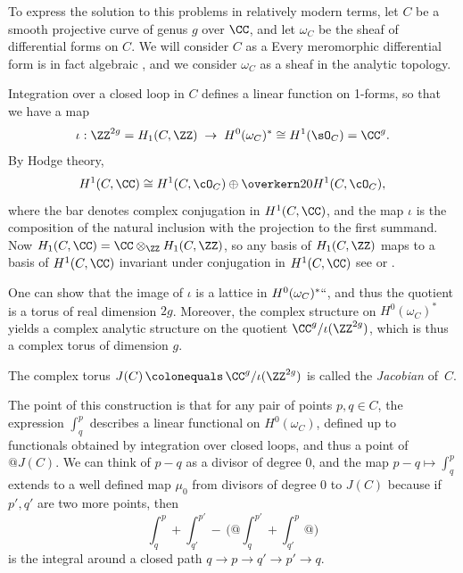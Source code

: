 To express the solution to this problems in relatively modern terms,
let $C$ be a smooth projective curve of genus $g$ over $\CC$, and let
$\omega_{C}$ be the sheaf of differential forms on $C$. We will
consider $C$ as a 
%
%
Every meromorphic differential form is in fact algebraic
\cite{SerreGAGA}, and we consider $\omega_{C}$ as a sheaf in the analytic topology.

Integration 
%
over a closed loop in $C$ defines a linear function on 1-forms, so that we have a map
$$
\iota: \ZZ^{2g} = H_1(C,\ZZ) \; \to \;  H^0(\omega_C)^* \cong H^1(\sO_C) = \CC^{g}.
$$
By Hodge theory, 
% 
$$
H^1(C, \CC) \cong H^1(C, \cO_C) \oplus \overkern20{H^1(C, \cO_C)}
,
$$
where the bar denotes complex conjugation in $H^1(C, \CC)$, and the map $\iota$ is the composition of 
 the natural inclusion with the projection to the first summand.
 Now
$H_1(C,\CC) = \CC\otimes_\ZZ H_1(C,\ZZ)$, so any basis of $H_1(C,\ZZ)$ maps to a basis of 
$H^1(C, \CC)$ invariant under conjugation in $H^1(C, \CC)$\emdash 
see \cite{Voisin} or \cite[p.\,116]{Griffiths-Harris1978}. 

One can show that the image of $\iota$ is a 
%
lattice in $H^0(\omega_C)^*` `$, and thus the quotient
is a torus of real dimension $2g$. 
Moreover, the
complex structure on $H^0(\omega_C)^*$ yields a complex analytic structure on the quotient $\CC^{g}/\iota(\ZZ^{2g})$, which is thus a complex torus of  dimension $g$.  
%

\begin{definition}
\hskip-3pt
The complex torus $J(C) \,{\colonequals}\, \CC^{g}/\iota(\ZZ^{2g})$ 
%
%
is called the \emph{Jacobian} of~$C$.%
\unif
\end{definition}

The point of this construction is that for any pair of points $p, q
\in C$, the expression $\int_q^p$ describes a linear functional on
$H^0(\omega_C)$, defined up to functionals obtained by integration
over closed loops, and thus a point of $@J(C)$. We can think of $p-q$
as a divisor of 
degree 0, and the map $p-q \mapsto \int_q^p$ extends to a well defined map $\mu_0$ from divisors of degree 0 to $J(C)$ because if $p',q'$ are two more points, then
{\meshing
$$
\int_q^p +\int_{q'}^{p'} \! - \,\biggl(@\int_q^{p'} +\int_{q'}^p@\biggr) 
$$}%
is the integral around a closed path $q\to p\to q'\to p' \to q$.

